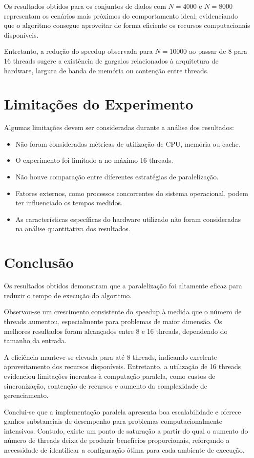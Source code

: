 \documentclass[
12pt,
oneside,
a4paper,
brazil
]{abntex2}
\begin{document}
Os resultados obtidos para os conjuntos de dados com $N = 4000$ e $N = 8000$ representam os cenários mais próximos do comportamento ideal, evidenciando que o algoritmo consegue aproveitar de forma eficiente os recursos computacionais disponíveis.

Entretanto, a redução do speedup observada para $N = 10000$ ao passar de 8 para 16 threads sugere a existência de gargalos relacionados à arquitetura de hardware, largura de banda de memória ou contenção entre threads.

\section{Limitações do Experimento}

Algumas limitações devem ser consideradas durante a análise dos resultados:
\begin{itemize}
	\item Não foram consideradas métricas de utilização de CPU, memória ou cache.
	\item O experimento foi limitado a no máximo 16 threads.
	\item Não houve comparação entre diferentes estratégias de paralelização.
	\item Fatores externos, como processos concorrentes do sistema operacional, podem ter influenciado os tempos medidos.
	\item As características específicas do hardware utilizado não foram consideradas na análise quantitativa dos resultados.
\end{itemize}

\section{Conclusão}

Os resultados obtidos demonstram que a paralelização foi altamente eficaz para reduzir o tempo de execução do algoritmo.

Observou-se um crescimento consistente do speedup à medida que o número de threads aumentou, especialmente para problemas de maior dimensão. Os melhores resultados foram alcançados entre 8 e 16 threads, dependendo do tamanho da entrada.

A eficiência manteve-se elevada para até 8 threads, indicando excelente aproveitamento dos recursos disponíveis. Entretanto, a utilização de 16 threads evidenciou limitações inerentes à computação paralela, como custos de sincronização, contenção de recursos e aumento da complexidade de gerenciamento.

Conclui-se que a implementação paralela apresenta boa escalabilidade e oferece ganhos substanciais de desempenho para problemas computacionalmente intensivos. Contudo, existe um ponto de saturação a partir do qual o aumento do número de threads deixa de produzir benefícios proporcionais, reforçando a necessidade de identificar a configuração ótima para cada ambiente de execução.
\end{document}
